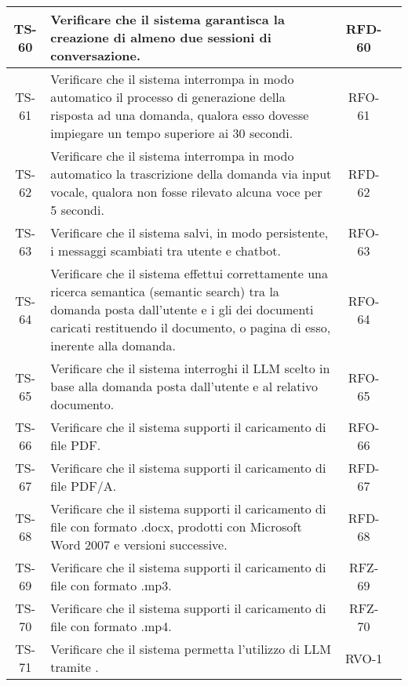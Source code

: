 \begin{xltabular}{\textwidth}{| c | X | c | c |}
    \hline
    TS-60 & Verificare che il sistema garantisca la creazione di almeno due sessioni di conversazione. & RFD-60 & \textcolor{cmarkcolor}{} \\
    \hline
    TS-61 & Verificare che il sistema interrompa in modo automatico il processo di generazione della risposta ad una domanda, qualora esso dovesse impiegare un tempo superiore ai 30 secondi. & RFO-61 & \textcolor{cmarkcolor}{}\\
    \hline
    TS-62 & Verificare che il sistema interrompa in modo automatico la trascrizione della domanda via input vocale, qualora non fosse rilevato alcuna voce per 5 secondi. & RFD-62 & \textcolor{xmarkcolor}{} \\
    \hline
    TS-63 & Verificare che il sistema salvi, in modo persistente, i messaggi scambiati tra utente e chatbot. & RFO-63 & \textcolor{cmarkcolor}{}\\
    \hline
    TS-64 & Verificare che il sistema effettui correttamente una ricerca semantica (semantic search) tra la domanda posta dall'utente e i gli  dei documenti caricati restituendo il documento, o pagina di esso, inerente alla domanda. & RFO-64 & \textcolor{cmarkcolor}{} \\
    \hline
    TS-65 & Verificare che il sistema interroghi il LLM scelto in base alla domanda posta dall'utente e al relativo documento. & RFO-65 & \textcolor{cmarkcolor}{} \\
    \hline
    TS-66 & Verificare che il sistema supporti il caricamento di file PDF. & RFO-66 & \textcolor{cmarkcolor}{} \\
    \hline
    TS-67 & Verificare che il sistema supporti il caricamento di file PDF/A. & RFD-67 & \textcolor{cmarkcolor}{} \\
    \hline
    TS-68 & Verificare che il sistema supporti il caricamento di file con formato .docx, prodotti con Microsoft Word 2007 e versioni successive. & RFD-68 & \textcolor{cmarkcolor}{} \\
    \hline
    TS-69 & Verificare che il sistema supporti il caricamento di file con formato .mp3. & RFZ-69 & \textcolor{cmarkcolor}{} \\
    \hline
    TS-70 & Verificare che il sistema supporti il caricamento di file con formato .mp4. & RFZ-70 & \textcolor{xmarkcolor}{} \\
    \hline
    TS-71 & Verificare che il sistema permetta l'utilizzo di LLM tramite . & RVO-1 & \textcolor{cmarkcolor}{}\\

\end{xltabular}
